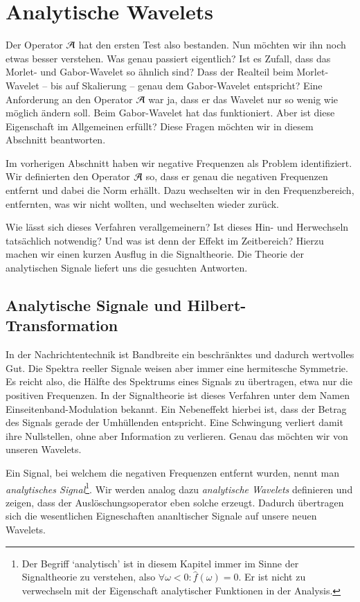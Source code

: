 \section{Analytische Wavelets}
Der Operator $\Ana\,$ hat den ersten Test also bestanden.
Nun möchten wir ihn noch etwas besser verstehen.
Was genau passiert eigentlich?
Ist es Zufall, dass das Morlet- und Gabor-Wavelet so ähnlich sind?
Dass der Realteil beim Morlet-Wavelet -- bis auf Skalierung -- genau dem Gabor-Wavelet entspricht?
Eine Anforderung an den Operator $\Ana\,$ war ja, dass er das Wavelet nur so wenig wie möglich ändern soll.
Beim Gabor-Wavelet hat das funktioniert.
Aber ist diese Eigenschaft im Allgemeinen erfüllt?
Diese Fragen möchten wir in diesem Abschnitt beantworten.

Im vorherigen Abschnitt haben wir negative Frequenzen als Problem identifiziert.
Wir definierten den Operator $\Ana\,$ so, dass er genau die negativen Frequenzen entfernt und dabei die Norm erhällt.
Dazu wechselten wir in den Frequenzbereich, entfernten, was wir nicht wollten, und wechselten wieder zurück.

Wie lässt sich dieses Verfahren verallgemeinern? 
Ist dieses Hin- und Herwechseln tatsächlich notwendig?
Und was ist denn der Effekt im Zeitbereich?
Hierzu machen wir einen kurzen Ausflug in die Signaltheorie.
Die Theorie der analytischen Signale liefert uns die gesuchten Antworten.


\subsection{Analytische Signale und Hilbert-Transformation}
In der Nachrichtentechnik ist Bandbreite ein beschränktes und dadurch wertvolles Gut.
Die Spektra reeller Signale weisen aber immer eine hermitesche Symmetrie.
Es reicht also, die Hälfte des Spektrums eines Signals zu übertragen, etwa nur die positiven Frequenzen.
In der Signaltheorie ist dieses Verfahren unter dem Namen Einseitenband-Modulation bekannt.
Ein Nebeneffekt hierbei ist, dass der Betrag des Signals gerade der Umhüllenden entspricht.
Eine Schwingung verliert damit ihre Nullstellen, ohne aber Information zu verlieren.
Genau das möchten wir von unseren Wavelets.

Ein Signal, bei welchem die negativen Frequenzen entfernt wurden, nennt man \emph{analytisches Signal}\footnote{
	Der Begriff `analytisch' ist in diesem Kapitel immer im Sinne der Signaltheorie zu verstehen, also $\forall \omega < 0 \colon \hat f (\omega) = 0 $.
	Er ist nicht zu verwechseln mit der Eigenschaft analytischer Funktionen in der Analysis.
}.
Wir werden analog dazu \emph{analytische Wavelets} definieren und zeigen, dass der Auslöschungsoperator eben solche erzeugt.
Dadurch übertragen sich die wesentlichen Eigneschaften ananltischer Signale auf unsere neuen Wavelets.

